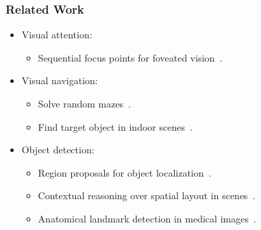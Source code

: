 \begin{frame}
    \frametitle{Related Work}

    \begin{itemize}
        \item Visual attention:
        \begin{itemize}
            \item Sequential focus points for foveated vision~\cite{mnih_recurrent_2014}.
        \end{itemize}
        \item Visual navigation:
        \begin{itemize}
            \item Solve random mazes~\cite{mirowski_learning_2017}.
            \item Find target object in indoor scenes~\cite{zhu_target-driven_2017}.
        \end{itemize}
        \item Object detection:
        \begin{itemize}
            \item Region proposals for object localization~\cite{caicedo_active_2015}.
            \item Contextual reasoning over spatial layout in scenes~\cite{chen_spatial_2017}.
            \item Anatomical landmark detection in medical images~\cite{ghesu_multi-scale_2019}.
        \end{itemize}
    \end{itemize}
\end{frame}